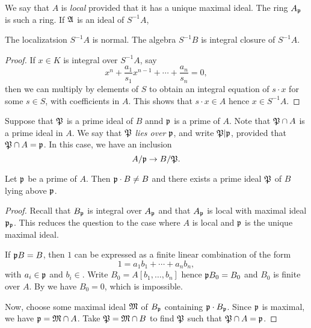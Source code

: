 We say that $A$ is \emph{local} provided that it has a unique maximal ideal.
The ring $A_{\mathfrak{p}}$ is such a ring.
If $\mathfrak{A}$ is an ideal of $S^{-1}A$, 

\begin{proposition}
  The localizatsion $S^{-1}A$ is normal.
  The algebra $S^{-1}B$ is integral closure of $S^{-1}A$.
\end{proposition}
\begin{proof}
  If $x \in K$ is integral over $S^{-1}A$, say
  \[ x^{n} + \frac{a_{1}}{s_{1}} x^{n-1} + \cdots + \frac{a_{n}}{s_{n}} = 0, \]
  then we can multiply by elements of $S$ to obtain an integral equation of $s \cdot x$ for some $s \in S$, with coefficients in $A$.
  This shows that $s \cdot x \in A$ hence $x \in S^{-1} A$.
\end{proof}

Suppose that $\mathfrak{P}$ is a prime ideal of $B$ annd $\mathfrak{p}$ is a prime of $A$.
Note that $\mathfrak{P} \cap A$ is a prime ideal in $A$.
We say that $\mathfrak{P}$ \emph{lies over} $\mathfrak{p}$, and write $\mathfrak{P} | \mathfrak{p}$, provided that $\mathfrak{P} \cap A = \mathfrak{p}$.
In this case, we have an inclusion
\[ A/\mathfrak{p} \to B/\mathfrak{P}. \]

\begin{proposition}\label{proposition:exists_prime_above}
  Let $\mathfrak{p}$ be a prime of $A$.
  Then $\mathfrak{p} \cdot B \neq B$ and there exists a prime ideal $\mathfrak{P}$ of $B$ lying above $\mathfrak{p}$.
\end{proposition}
\begin{proof}
  Recall that $B_{\mathfrak{p}}$ is integral over $A_{\mathfrak{p}}$ and that $A_{\mathfrak{p}}$ is local with maximal ideal $\mathfrak{p}_{\mathfrak{p}}$.
  This reduces the question to the case where $A$ is local and $\mathfrak{p}$ is the unique maximal ideal.

  If $\mathfrak{p} B = B$, then $1$ can be expressed as a finite linear combination of the form
  \[ 1 = a_{1} b_{1} + \cdots + a_{n} b_{n}, \]
  with $a_{i} \in \mathfrak{p}$ and $b_{i} \in $.
  Write $B_{0} = A[b_{1},\ldots,b_{n}]$ hence $\mathfrak{p} B_{0} = B_{0}$ and $B_{0}$ is finite over $A$.
  By  we have $B_{0} = 0$, which is impossible.

  Now, choose some maximal ideal $\mathfrak{M}$ of $B_{\mathfrak{p}}$ containing $\mathfrak{p} \cdot B_{\mathfrak{p}}$.
  Since $\mathfrak{p}$ is maximal, we have $\mathfrak{p} = \mathfrak{M} \cap A$.
  Take $\mathfrak{P} = \mathfrak{M} \cap B$ to find $\mathfrak{P}$ such that $\mathfrak{P} \cap A = \mathfrak{p}$.
\end{proof}


